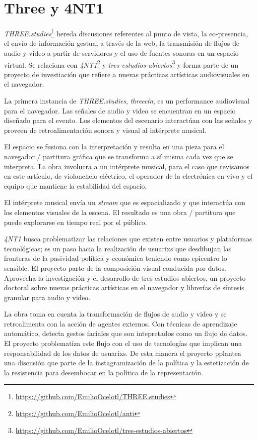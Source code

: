 
\section*{Three y 4NT1} %

\textit{THREE.studies}\footnote{\url{https://github.com/EmilioOcelotl/THREE.studies}} hereda discusiones referentes al punto de vista, la co-presencia, el envío de información gestual a través de la web, la transmisión de flujos de audio y video a partir de servidores y el uso de fuentes sonoras en un espacio virtual. Se relaciona con \textit{4NT1}\footnote{\url{https://github.com/EmilioOcelotl/anti}} y \textit{tres-estudios-abiertos}\footnote{\url{https://github.com/EmilioOcelotl/tres-estudios-abiertos}} y forma parte de un proyecto de investiación que refiere a nuevas prácticas artísticas audiovisuales en el navegador.  

La primera instancia de \textit{THREE.studies}, \textit{threecln}, es un performance audiovisual para el navegador. Las señales de audio y video se encuentran en un espacio diseñado para el evento. Los elementos del escenario interactúan con las señales y proveen de retroalimentación sonora y visual al intérprete musical.

El espacio se fusiona con la interpretación y resulta en una pieza para el navegador / partitura gráfica que se transforma a sí misma cada vez que se interpreta. La obra involucra a un intérprete musical, para el caso que revisamos en este artículo, de violonchelo eléctrico, el operador de la electrónica en vivo y el equipo que mantiene la estabilidad del espacio.

El intérprete musical envía un \textit{stream} que es espacializado y que interactúa con los elementos visuales de la escena. El resultado es una obra / partitura que puede explorarse en tiempo real por el público. 

\textit{4NT1} busca problematizar las relaciones que existen entre usuarios y plataformas tecnológicas; es un paso hacia la realización de usuarixs que desdibujan las fronteras de la pasividad política y económica teniendo como epicentro lo sensible. El proyecto parte de la composición visual conducida por datos. Aprovecha la investigación y el desarrollo de tres estudios abiertos, un proyecto doctoral sobre nuevas prácticas artísticas en el navegador y librerías de síntesis granular para audio y video.

La obra toma en cuenta la transformación de flujos de audio y video y se retroalimenta con la acción de agentes externos. Con técnicas de aprendizaje automático, detecta gestos faciales que son intepretados como un flujo de datos. El proyecto problematiza este flujo con el uso de tecnologías que implican una responsabilidad de los datos de usuarixs. De esta manera el proyecto pplantea una discusión que parte de la instagramización de la política y la estetización de la resistencia para desembocar en la política de la representación.

